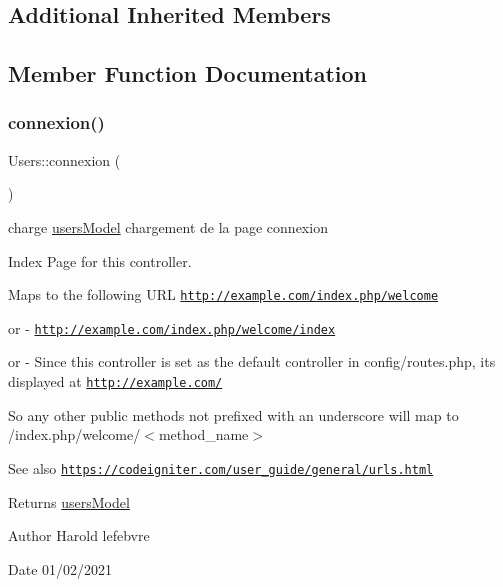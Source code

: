 \subsection*{Additional Inherited Members}


\subsection{Member Function Documentation}
\mbox{\label{class_users_a9c03f539ceb015f03a9af29db1699504}} 
\subsubsection{\texorpdfstring{connexion()}{connexion()}}
{\footnotesize\ttfamily Users\+::connexion (\begin{DoxyParamCaption}{ }\end{DoxyParamCaption})}



charge \mbox{\hyperlink{classusers_model}{users\+Model}} chargement de la page connexion 

Index Page for this controller.

Maps to the following U\+RL \href{http://example.com/index.php/welcome}{\tt http\+://example.\+com/index.\+php/welcome}
\begin{DoxyItemize}
\item or -\/ \href{http://example.com/index.php/welcome/index}{\tt http\+://example.\+com/index.\+php/welcome/index}
\item or -\/ Since this controller is set as the default controller in config/routes.\+php, it\textquotesingle{}s displayed at \href{http://example.com/}{\tt http\+://example.\+com/}
\end{DoxyItemize}

So any other public methods not prefixed with an underscore will map to /index.php/welcome/$<$method\+\_\+name$>$ \begin{DoxySeeAlso}{See also}
\href{https://codeigniter.com/user_guide/general/urls.html}{\tt https\+://codeigniter.\+com/user\+\_\+guide/general/urls.\+html} 
\end{DoxySeeAlso}
\begin{DoxyReturn}{Returns}
\mbox{\hyperlink{classusers_model}{users\+Model}} 
\end{DoxyReturn}
\begin{DoxyAuthor}{Author}
Harold lefebvre 
\end{DoxyAuthor}
\begin{DoxyDate}{Date}
01/02/2021 
\end{DoxyDate}
\mbox{\label{class_users_a9d20501a1404b7175c40417d94e6172a}} 
